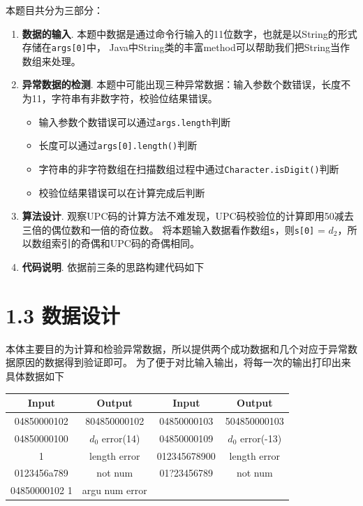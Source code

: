 本题目共分为三部分：
\begin{enumerate}
    \item \textbf{数据的输入}. 本题中数据是通过命令行输入的11位数字，也就是以String的形式存储在\lstinline{args[0]}中，
        Java中String类的丰富method可以帮助我们把String当作数组来处理。
    \item \textbf{异常数据的检测}. 本题中可能出现三种异常数据：输入参数个数错误，长度不为11，字符串有非数字符，校验位结果错误。
    \begin{itemize}
        \item 输入参数个数错误可以通过\lstinline{args.length}判断
        \item 长度可以通过\lstinline{args[0].length()}判断
        \item 字符串的非字符数组在扫描数组过程中通过\lstinline{Character.isDigit()}判断
        \item 校验位结果错误可以在计算完成后判断
    \end{itemize}
    \item \textbf{算法设计}. 观察UPC码的计算方法不难发现，UPC码校验位的计算即用50减去三倍的偶位数和一倍的奇位数。
        将本题输入数据看作数组\lstinline{s}，则\lstinline{s[0]} = $d_{2}$，所以数组索引的奇偶和UPC码的奇偶相同。 
    \item \textbf{代码说明}. 依据前三条的思路构建代码如下
    
\end{enumerate}

\section{1.3 数据设计}

本体主要目的为计算和检验异常数据，所以提供两个成功数据和几个对应于异常数据原因的数据得到验证即可。
为了便于对比输入输出，将每一次的输出打印出来
具体数据如下
\begin{table}[H]
    \centering
    \begin{tabular}{|c|c|c|c|}
    \hline
    \textbf{Input} & \textbf{Output} & \textbf{Input} & \textbf{Output} \\ \hline
    04850000102    & 804850000102    & 04850000103    & 504850000103    \\ \hline
    04850000100    & $d_0$ error(14)        & 04850000109    & $d_0$ error(-13)        \\ \hline
    1              & length error    & 012345678900   & length error    \\ \hline
    0123456a789    & not num         & 01?23456789    & not num         \\ \hline
    04850000102 1 & argu num error  &   & \\ \hline
    \end{tabular}
\end{table}

